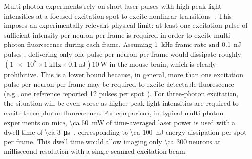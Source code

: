 Multi-photon experiments rely on short laser pulses with high peak light intensities at a focused excitation spot to excite nonlinear transitions~\cite{kim99}.
This imposes an experimentally relevant physical limit: at least one excitation pulse of sufficient intensity per neuron per frame is required in order to excite multi-photon fluorescence during each frame.
Assuming \SI{1}{\kilo\hertz} frame rate and \SI{0.1}{\nano\joule} pulses \cite{cheng2011simultaneous}, delivering only one pulse per neuron per frame would dissipate roughly $\left(\num{1e8}\times\SI{1}{\kilo\hertz}\times\SI{0.1}{\nano\joule}\right) \SI{10}{\watt}$ in the mouse brain, which is clearly prohibitive.
This is a lower bound because, in general, more than one excitation pulse per neuron per frame may be required to excite detectable fluorescence (e.g., one reference reported 12 pulses per spot~\cite{kim99}).
For three-photon excitation, the situation will be even worse as higher peak light intensities are required to excite three-photon fluorescence. For comparison, in typical multi-photon experiments on mice, \SI{\ca 50}{\milli\watt} of time-averaged laser power is used with a dwell time of \SI{\ca 3}{\micro\second}~\cite{wilson07}, corresponding to \SI{\ca 100}{\nano\joule} energy dissipation per spot per frame. This dwell time would allow imaging only \num{\ca 300} neurons at millisecond resolution with a single scanned excitation beam.

